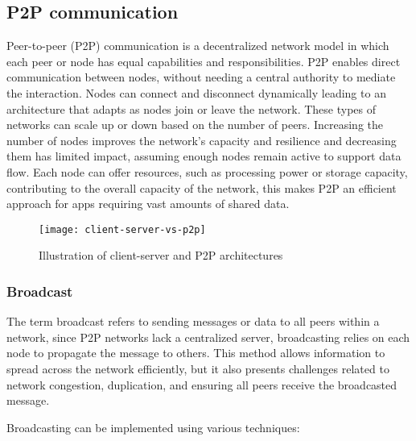 \subsection{P2P communication}
\label{sec:p2p_communication}

Peer-to-peer (P2P) communication is a decentralized network model in which each peer or node has equal capabilities and responsibilities. \gls{P2P} enables direct communication between nodes, without needing a central authority to mediate the interaction.
  Nodes can connect and disconnect dynamically leading to an architecture that adapts as nodes join or leave the network. 
  These types of networks can scale up or down based on the number of peers. Increasing the number of nodes improves the network's capacity and resilience and decreasing them has limited impact, assuming enough nodes remain active to support data flow. Each node can offer resources, such as processing power or storage capacity, contributing to the overall capacity of the network, this makes \gls{P2P} an efficient approach for apps requiring vast amounts of shared data.
  
  
\begin{figure}[H]
  \centering
  \texttt{[image: client-server-vs-p2p]}
  \caption{Illustration of client-server and P2P architectures}
  \label{fig:client-server-vs-p2p}
\end{figure}
  
\subsubsection{Broadcast}
\label{sec:Broadcast}

The term broadcast refers to sending messages or data to all peers within a network, since \gls{P2P} networks lack a centralized server, broadcasting relies on each node to propagate the message to others.
This method allows information to spread across the network efficiently, but it also presents challenges related to network congestion, duplication, and ensuring all peers receive the broadcasted message.

Broadcasting can be implemented using various techniques:

